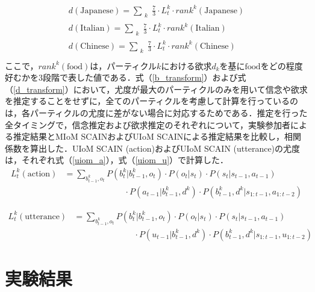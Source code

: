 \begin{equation}
  \begin{split}
  \label{d_transform}
  d(\mathrm{Japanese})= \sum_{\substack{k}} \frac{7}{3}\cdot L^k_t \cdot rank^k({\mathrm{Japanese}})\\
  d(\mathrm{Italian})= \sum_{\substack{k}} \frac{7}{3}\cdot L^k_t \cdot rank^k({\mathrm{Italian}})\\
  d(\mathrm{Chinese})= \sum_{\substack{k}} \frac{7}{3}\cdot L^k_t \cdot rank^k({\mathrm{Chinese}})\\
  \end{split}
\end{equation}
ここで，$rank^k(\mathrm{food})$は，パーティクル$k$における欲求$d_k$を基に$\mathrm{food}$をどの程度好むかを3段階で表した値である．式（\ref{b_transform}）および式（\ref{d_transform}）において，尤度が最大のパーティクルのみを用いて信念や欲求を推定することをせずに，全てのパーティクルを考慮して計算を行っているのは，各パーティクルの尤度に差がない場合に対応するためである．推定を行った全タイミングで，信念推定および欲求推定のそれぞれについて，実験参加者による推定結果とMIoM SCAINおよびUIoM SCAINによる推定結果を比較し，相関係数を算出した．UIoM SCAIN (action)およびUIoM SCAIN (utterance)の尤度は，それぞれ式（\ref{uiom_a}），式（\ref{uiom_u}）で計算した．
\begin{equation}
  \begin{split}
  \label{uiom_a}
  L^k_t({\mathrm{action}})&= \sum_{b_{t-1}^k,o_t}P(b_t^k|b_{t-1}^k,o_t)\cdot P(o_t|s_t)\cdot P(s_t|s_{t-1},a_{t-1})\\
  &\hspace{3cm}\cdot P(a_{t-1}|b_{t-1}^k,d^k)\cdot P(b_{t-1}^k,d^k|s_{1:t-1},a_{1:t-2})
  \end{split}
\end{equation}

\begin{equation}
  \begin{split}
  \label{uiom_u}
  L^k_t({\mathrm{utterance}})&= \sum_{b_{t-1}^k,o_t}P(b_t^k|b_{t-1}^k,o_t)\cdot P(o_t|s_t)\cdot P(s_t|s_{t-1},a_{t-1})\\
  &\hspace{3cm}\cdot P(u_{t-1}|b_{t-1}^k,d^k)\cdot P(b_{t-1}^k,d^k|s_{1:t-1},u_{1:t-2})
  \end{split}
\end{equation}


\section{実験結果}


